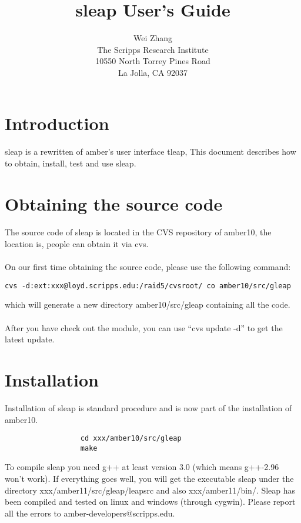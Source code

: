 \documentclass[letterpaper]{article}
\title{sleap User's Guide}
\author{Wei Zhang\\The Scripps Research Institute\\10550 North Torrey Pines Road\\La Jolla, CA 92037}
\begin{document}
\maketitle

\section{Introduction}

\paragraph*{}
  sleap is a rewritten of amber's user interface tleap, This document describes how to obtain, 
install, test and use sleap. 

\section{Obtaining the source code}

\paragraph*{}
  The source code of sleap is located in the CVS repository of amber10, the location is, people can
obtain it via cvs.

\paragraph*{}
  On our first time obtaining the source code, please use the following command:
\begin{lstlisting}
cvs -d:ext:xxx@loyd.scripps.edu:/raid5/cvsroot/ co amber10/src/gleap
\end{lstlisting}
which will generate a new directory amber10/src/gleap containing all the code.

\paragraph*{}
   After you have check out the module, you can use ``cvs update -d'' to get the latest update.
\section{Installation}

   Installation of sleap is standard procedure and is now part of the installation of amber10.
\begin{lstlisting}
                  cd xxx/amber10/src/gleap
                  make
\end{lstlisting}
To compile sleap you need g++ at least version 3.0 (which means g++-2.96 won't work). If everything 
goes well, you will get the executable sleap under the directory xxx/amber11/src/gleap/leapsrc and
also xxx/amber11/bin/. Sleap has been compiled and tested on linux and windows (through cygwin). Please 
report all the errors to amber-developers@scripps.edu.
\end{document}
